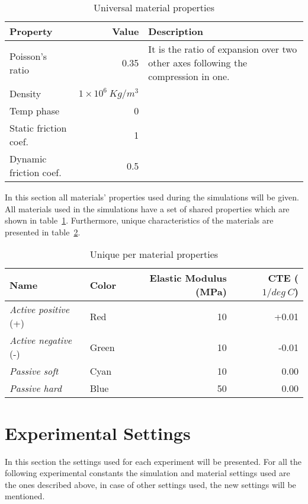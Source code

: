 \begin{table}[ht!]
\centering
\caption{Universal material properties}
\label{UniversalMaterialProperties}
    \begin{tabular}{l r p{7cm}}
    \toprule
    \textbf{Property} & \textbf{Value} & \textbf{Description}\\
    \midrule
    Poisson's ratio & 0.35 &  It is the ratio of expansion over two other axes following the compression in one.\\
    Density & $1\times10^{6}\   Kg/m^3$ & \\
    Temp phase & 0 & \\
    Static friction coef. & 1 & \\
    Dynamic friction coef. & 0.5 & \\
    \bottomrule
    \end{tabular}
\end{table}

In this section all materials' properties used during the simulations will be given. All materials used in the simulations have a set of shared properties which are shown in table~\ref{UniversalMaterialProperties}. Furthermore, unique characteristics of the materials are presented in table~\ref{UniqueMaterialProperties}.

\begin{table}[ht!]
\centering
\caption{Unique per material properties}
\label{UniqueMaterialProperties}
    \begin{tabular}{llrr}
    \toprule
    \textbf{Name}                & \textbf{Color} & \textbf{Elastic Modulus} (MPa) & \textbf{CTE} ($1/deg\ C$) \\
    \midrule
    \emph{Active positive} (+) & Red   & 10                    & +0.01\\
    \emph{Active negative} (-) & Green & 10                   & -0.01 \\
    \emph{Passive soft}       & Cyan  & 10                   & 0.00 \\
    \emph{Passive hard}        & Blue  & 50                   & 0.00\\
    \bottomrule
    \end{tabular}
\end{table}


\section{Experimental Settings}
In this section the settings used for each experiment will be presented. For all the following experimental constants the simulation and material settings used are the ones described above, in case of other settings used, the new settings will be mentioned.
